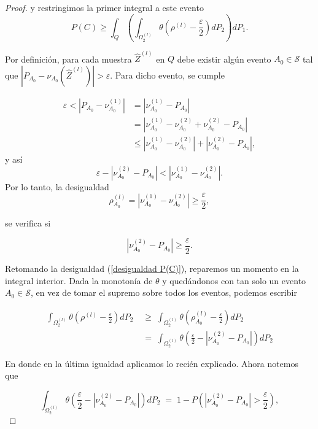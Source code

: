 \documentclass{report}
\begin{document}
\begin{proof}
y restringimos la primer integral a este evento
\begin{equation}
P(C) \geq \int_{Q} \left( \int_{ \Omega_2^{(l)}}  \theta\left(\rho^{(l)}-\frac{\varepsilon}{2}\right) dP_2\right) dP_1. \label{desigualdad P(C)}
\end{equation}

Por definición, para cada muestra $\hat{Z}^{(l)}$ en $Q$ debe existir algún evento $A_0\in\mathcal{S}$ tal que $|P_{A_0}-\nu_{A_0}\left(\hat{Z}^{(l)}\right)|>\varepsilon$.
Para dicho evento, se cumple

\[
\begin{aligned}
    \varepsilon < \left|P_{A_0}-\nu_{A_0}^{(1)}\right| &= \left|\nu_{A_0}^{(1)}-P_{A_0}\right|\\
    & = \left|\nu_{A_0}^{(1)}-\nu_{A_0}^{(2)}+\nu_{A_0}^{(2)}-P_{A_0}\right| \\
    & \leq \left|\nu_{A_0}^{(1)}-\nu_{A_0}^{(2)}\right|+\left|\nu_{A_0}^{(2)}-P_{A_0}\right|,
\end{aligned}
\]
y así
\[
    \varepsilon - \left|\nu_{A_0}^{(2)}-P_{A_0}\right| < \left|\nu_{A_0}^{(1)}-\nu_{A_0}^{(2)}\right|.
\]\newline
Por lo tanto, la desigualdad
\[
\rho_{A_0}^{(l)} = |\nu^{(1)}_{A_0}-\nu^{(2)}_{A_0}| \geq \frac{\varepsilon}{2},
\]

se verifica si 

\[
|\nu^{(2)}_{A_0}-P_{A_0}|\geq \frac{\varepsilon}{2}.
\]

Retomando la desigualdad (\ref{desigualdad P(C)}), reparemos un momento en la integral interior. 
Dada la monotonía de $\theta$ y quedándonos
con tan solo un evento $A_0\in\mathcal{S}$, en vez de tomar el supremo sobre todos los eventos, podemos escribir

\[
\begin{aligned}
\int_{ \Omega_2^{(l)}} \theta\left(\rho^{(l)}-\frac{\varepsilon}{2}\right) dP_2 \;&\geq\; \int_{ \Omega_2^{(l)}}  \theta\left(\rho^{(l)}_{A_0}-\frac{\varepsilon}{2}\right) dP_2 \\
& = \; \int_{ \Omega_2^{(l)}}  \theta\left(\frac{\varepsilon}{2} - |\nu^{(2)}_{A_0}-P_{A_0}|\right) dP_2
\end{aligned}
\]

En donde en la última igualdad aplicamos lo recién explicado. Ahora notemos que 

\begin{equation}\label{eq: theta como probabilidad}
    \int_{ \Omega_2^{(l)}}  \theta\left(\frac{\varepsilon}{2} - |\nu^{(2)}_{A_0}-P_{A_0}|\right) dP_2 \;=\; 1 - P\left(|\nu^{(2)}_{A_0}-P_{A_0}|>\frac{\varepsilon}{2}\right),
\end{equation}



\end{proof}
\end{document}
